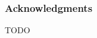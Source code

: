 \documentclass[11pt]{report} %
\begin{document}



\tableofcontents






%


%

%

%




\subsubsection*{Acknowledgments}
\label{sec:ack}
TODO



\appendix
%
\end{document}
